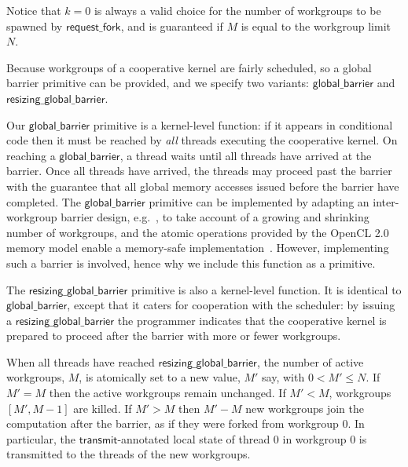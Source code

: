 \documentclass[parskip=half,sigconf,review, anonymous=true, acmcopyrightmode=none]{acmart}
\newcommand{\mysec}{Sec.~}
\newcommand{\transmit}{\mathsf{transmit}}
\newcommand{\offerfork}{\mathsf{request\_fork}}
\newcommand{\globalbarrier}{\mathsf{global\_barrier}}
\newcommand{\resizingglobalbarrier}{\mathsf{resizing\_global\_barrier}}
\begin{document}

Notice that $k=0$ is always a valid choice for the number of
workgroups to be spawned by $\offerfork$, and is guaranteed if $M$
is equal to the workgroup limit $N$.

%
Because workgroups of a cooperative kernel are fairly scheduled, so a
global barrier primitive can be provided, and we specify two variants: $\globalbarrier$
and $\resizingglobalbarrier$.

Our $\globalbarrier$ primitive is a kernel-level function: if it
appears in conditional code then it must be reached by \emph{all}
threads executing the cooperative kernel.  On reaching a
$\globalbarrier$, a thread waits until all threads have arrived at
the barrier.  Once all threads have arrived, the threads may proceed
past the barrier with the guarantee that all global memory accesses
issued before the barrier have completed.  The $\globalbarrier$
primitive can be implemented by adapting an inter-workgroup barrier
design, e.g.~\cite{XF10}, to take account of a growing and shrinking number of workgroups, and the atomic operations provided by
the OpenCL 2.0 memory model enable a memory-safe
implementation~\cite{DBLP:conf/oopsla/SorensenDBGR16}.  However, implementing such a barrier is
involved, hence why we include this function as a primitive.

The $\resizingglobalbarrier$ primitive is also a kernel-level
function.  It is identical to $\globalbarrier$, except that it caters
for cooperation with the scheduler: by issuing a
$\resizingglobalbarrier$ the programmer indicates that the cooperative
kernel is prepared to proceed after the barrier with more or fewer workgroups.

When all threads have reached $\resizingglobalbarrier$,
the number of active workgroups, $M$, is atomically set to a new value, $M'$ say, with $0 < M' \leq N$.
If $M' = M$ then the active workgroups remain unchanged.  If $M' < M$, workgroups $[M', M-1]$ are
killed.  If $M' > M$ then $M'-M$ new workgroups join the computation after the barrier,
as if they were forked from workgroup 0.  In particular, the
$\transmit$-annotated local state of thread 0 in workgroup 0 is
transmitted to the threads of the new workgroups.
\end{document}
